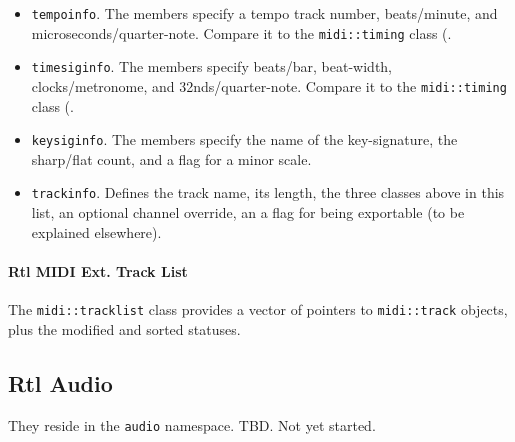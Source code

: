    \begin{itemize}
      \item \texttt{tempoinfo}.
         The members specify a tempo track number, beats/minute, and
         microseconds/quarter-note.
         Compare it to the \texttt{midi::timing} class
         (.
      \item \texttt{timesiginfo}.
         The members specify beats/bar, beat-width, clocks/metronome, and
         32nds/quarter-note.
         Compare it to the \texttt{midi::timing} class
         (.
      \item \texttt{keysiginfo}.
         The members specify the name of the key-signature, the sharp/flat
         count, and a flag for a minor scale.
      \item \texttt{trackinfo}.
         Defines the track name, its length, the three classes above in this
         list, an optional channel override, an a flag for being
         exportable (to be explained elsewhere).
   \end{itemize}

\paragraph{Rtl MIDI Ext. Track List}
\label{paragraph:rtl_midi_extensions_track_list}

   The \texttt{midi::tracklist} class provides a vector of
   pointers to \texttt{midi::track} objects, plus the modified and sorted
   statuses.

\subsection{Rtl Audio}
\label{subsec:rtl_audio}

   They reside in the \texttt{audio} namespace.
   TBD. Not yet started.

